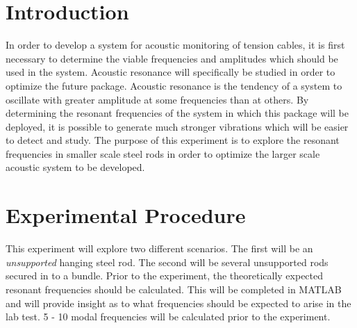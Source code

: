 \documentclass[10pt,letterpaper,titlepage]{article}
\begin{document}
\title{\Report}
\date{\today}
\author{\Author \\ \Class \\ \Professor}	

\rhead{\Last}
\lhead{\Report}
\pagestyle{fancy}

\maketitle

% 
\newpage



\newpage

\section{Introduction}

In order to develop a system for acoustic monitoring of tension cables, it is first necessary to determine the viable frequencies and amplitudes which should be used in the system. Acoustic resonance will specifically be studied in order to optimize the future package. Acoustic resonance is the tendency of a system to oscillate with greater amplitude at some frequencies than at others. By determining the resonant frequencies of the system in which this package will be deployed, it is possible to generate much stronger vibrations which will be easier to detect and study. The purpose of this experiment is to explore the resonant frequencies in smaller scale steel rods in order to optimize the larger scale acoustic system to be developed.

\section{Experimental Procedure}

This experiment will explore two different scenarios. The first will be an \emph{unsupported} hanging steel rod. The second will be several unsupported rods secured in to a bundle. Prior to the experiment, the theoretically expected resonant frequencies should be calculated. This will be completed in MATLAB and will provide insight as to what frequencies should be expected to arise in the lab test. 5 - 10 modal frequencies will be calculated prior to the experiment. 
\end{document}
